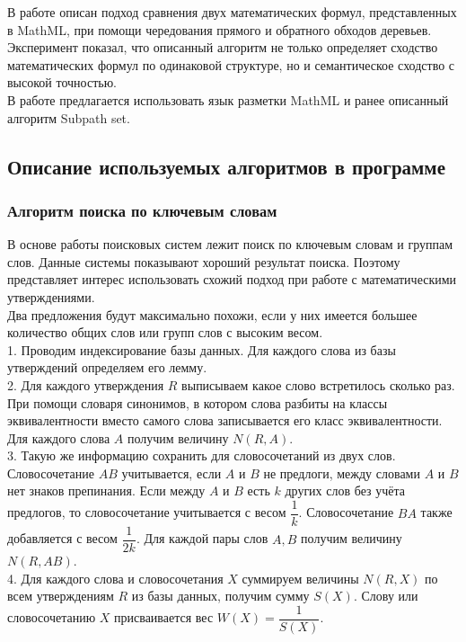 \documentclass[12pt]{article}
\begin{document}
В работе \cite{Yuping} описан подход сравнения двух математических формул, представленных в MathML,  при помощи чередования прямого и обратного обходов деревьев. Эксперимент показал, что описанный алгоритм не только определяет сходство математических формул по одинаковой структуре, но и семантическое сходство с высокой точностью. \\

В работе \cite{Keisuke Yokoi and Akiko Aizawa} предлагается использовать язык разметки MathML и ранее описанный алгоритм Subpath set.  

\subsection{Описание используемых алгоритмов в программе}
\subsubsection{Алгоритм поиска по ключевым словам}
В основе работы поисковых систем лежит поиск по ключевым словам и группам слов. Данные системы показывают хороший результат поиска. Поэтому представляет интерес использовать схожий подход при работе с математическими утверждениями.\\

Два предложения будут максимально похожи, если у них имеется большее количество общих слов или групп слов с высоким весом.\\

1. Проводим индексирование базы данных. Для каждого слова из базы утверждений определяем его лемму. \\

2. Для каждого утверждения $R$ выписываем какое слово встретилось сколько раз. При помощи словаря синонимов, в котором слова разбиты на классы эквивалентности вместо самого слова записывается его класс эквивалентности. Для каждого слова $A$ получим величину $N(R,A)$. \\

3. Такую же информацию сохранить для словосочетаний из двух слов. Словосочетание $AB$ учитывается, если $A$ и $B$ не предлоги, между словами $A$ и $B$ нет знаков препинания. Если между $A$ и $B$ есть $k$ других слов без учёта предлогов, то словосочетание учитывается с весом $\dfrac{1}{k}$. Словосочетание $BA$ также добавляется с весом $\dfrac{1}{2k}$. Для каждой пары слов $A,B$ получим величину $N(R,AB)$.\\

4. Для каждого слова и словосочетания $X$ суммируем величины $N(R,X)$ по всем утверждениям $R$ из базы данных, получим сумму $S(X)$. Слову или словосочетанию $X$ присваивается вес $W(X)=\dfrac{1}{S(X)}$.\\
\end{document}
